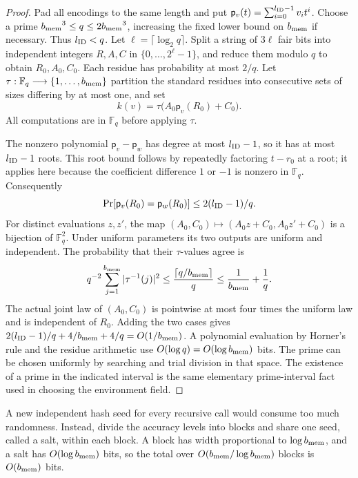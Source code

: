 \documentclass[11pt]{article}
\numberwithin{equation}{section}
\theoremstyle{definition}
\theoremstyle{remark}
\begin{document}
\begin{proof}
Pad all encodings to the same length and put
${\mathsf{p}}_v({t})=\sum_{i=0}^{{l_{\rm ID}}-1}v_i{t}^i$.  Choose a prime
${b_{\rm mem}}^3\le q\le2{b_{\rm mem}}^3$, increasing the fixed lower bound on ${b_{\rm mem}}$ if necessary.
Thus ${l_{\rm ID}}<q$.  Let $\ell=\lceil\log_2q\rceil$.  Split a string of $3\ell$
fair bits into independent integers $R,A,C$ in $\{0,\ldots,2^\ell-1\}$,
and reduce them modulo $q$ to obtain ${R_0},A_0,C_0$.  Each residue has
probability at most $2/q$.  Let
$\tau:\mathbb F_q\longrightarrow\{1,\ldots,{b_{\rm mem}}\}$ partition the standard
residues into consecutive sets of sizes differing by at most one, and set
\[
 k(v)=\tau\bigl(A_0 {\mathsf{p}}_v({R_0})+C_0\bigr).
\]
All computations are in $\mathbb F_q$ before applying $\tau$.

The nonzero polynomial ${\mathsf{p}}_v-{\mathsf{p}}_w$ has degree at most ${l_{\rm ID}}-1$, so it has at most
${l_{\rm ID}}-1$ roots.  This root bound follows by repeatedly factoring ${t}-r_0$ at a
root; it applies here because the coefficient difference $1$ or $-1$ is
nonzero in $\mathbb F_q$.  Consequently
\[
 \Pr[{\mathsf{p}}_v({R_0})={\mathsf{p}}_w({R_0})]\le 2({l_{\rm ID}}-1)/q.
\]
For distinct evaluations $z,z'$, the map
$(A_0,C_0)\mapsto(A_0 z+C_0,A_0 z'+C_0)$ is a bijection
of $\mathbb F_q^2$.  Under uniform parameters its two outputs are uniform
and independent.  The probability that their $\tau$-values agree is
\[
 q^{-2}\sum_{j=1}^{b_{\rm mem}}|\tau^{-1}(j)|^2
 \le \frac{\lceil q/{b_{\rm mem}}\rceil}{q}\le\frac1{b_{\rm mem}}+\frac1q.
\]
The actual joint law of $(A_0,C_0)$ is pointwise at most four times
the uniform law and is independent of ${R_0}$.  Adding the two cases gives
$2({l_{\rm ID}}-1)/q+4/{b_{\rm mem}}+4/q=O(1/{b_{\rm mem}})$.  A polynomial evaluation by Horner's rule and
the residue arithmetic use $O(\log q)=O(\log {b_{\rm mem}})$ bits.  The prime can be
chosen uniformly by searching and trial division in that space.  The
existence of a prime in the indicated interval is the same elementary
prime-interval fact used in choosing the environment field.
\end{proof}

A new independent hash seed for every recursive call would consume too much randomness. Instead, divide the accuracy levels into blocks and share one seed, called a salt, within each block. A block has width proportional to $\log {b_{\rm mem}}$, and a salt has $O(\log {b_{\rm mem}})$ bits, so the total over $O({b_{\rm mem}}/\log {b_{\rm mem}})$ blocks is $O({b_{\rm mem}})$ bits.
\end{document}
